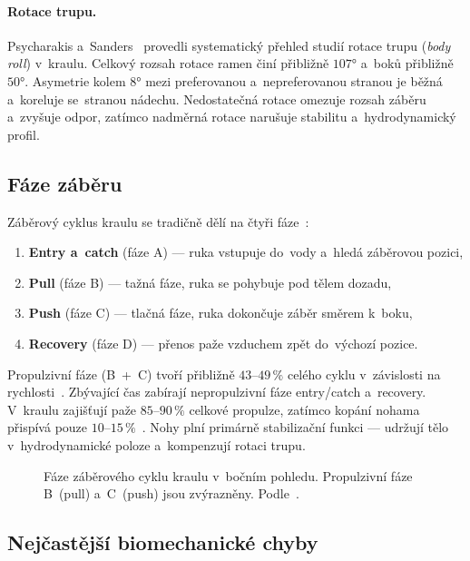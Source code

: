 \paragraph{Rotace trupu.}
Psycharakis a~Sanders~\cite{psycharakis2010} provedli systematický přehled studií rotace trupu (\textit{body roll}) v~kraulu. Celkový rozsah rotace ramen činí přibližně $107°$ a~boků přibližně $50°$. Asymetrie kolem $8°$ mezi preferovanou a~nepreferovanou stranou je běžná a~koreluje se~stranou nádechu. Nedostatečná rotace omezuje rozsah záběru a~zvyšuje odpor, zatímco nadměrná rotace narušuje stabilitu a~hydrodynamický profil.

\subsection{Fáze záběru}
\label{subsec:faze_zaberu}

Záběrový cyklus kraulu se tradičně dělí na čtyři fáze~\cite{chollet2000}:
\begin{enumerate}
    \item \textbf{Entry a~catch} (fáze A) --- ruka vstupuje do~vody a~hledá záběrovou pozici,
    \item \textbf{Pull} (fáze B) --- tažná fáze, ruka se pohybuje pod tělem dozadu,
    \item \textbf{Push} (fáze C) --- tlačná fáze, ruka dokončuje záběr směrem k~boku,
    \item \textbf{Recovery} (fáze D) --- přenos paže vzduchem zpět do~výchozí pozice.
\end{enumerate}
Propulzivní fáze (B~+~C) tvoří přibližně $43$--$49\,\%$ celého cyklu v~závislosti na rychlosti~\cite{chollet2000}. Zbývající čas zabírají nepropulzivní fáze entry/catch a~recovery. V~kraulu zajišťují paže $85$--$90\,\%$ celkové propulze, zatímco kopání nohama přispívá pouze $10$--$15\,\%$~\cite{barbosa2011}. Nohy plní primárně stabilizační funkci --- udržují tělo v~hydrodynamické poloze a~kompenzují rotaci trupu.

\begin{figure}[htbp]
    \centering
    \resizebox{\textwidth}{!}{}
    \caption{Fáze záběrového cyklu kraulu v~bočním pohledu. Propulzivní fáze B~(pull) a~C~(push) jsou zvýrazněny. Podle~\cite{chollet2000, barbosa2011}.}
    \label{fig:stroke_phases}
\end{figure}

\subsection{Nejčastější biomechanické chyby}
\label{subsec:chyby}

